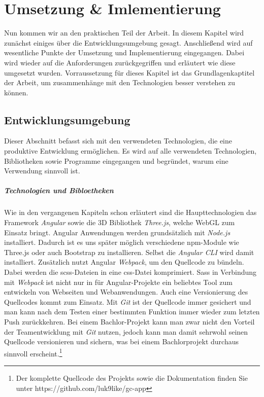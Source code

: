 %
%
%
\chapter{Umsetzung \& Imlementierung}
\label{cha:umsetzung}
%
Nun kommen wir an den praktischen Teil der Arbeit. In diesem Kapitel wird zunächst einiges über die Entwicklungsumgebung gesagt. Anschließend wird auf wesentliche Punkte der Umsetzung und Implementierung eingegangen. Dabei wird wieder auf die Anforderungen zurückgegriffen und erläutert wie diese umgesetzt wurden. Vorraussetzung für dieses Kapitel ist das Grundlagenkaptitel der Arbeit, um zusammenhänge mit den Technologien besser verstehen zu können.
\section{Entwicklungsumgebung}
\label{sec:umsetzung}
%
Dieser Abschnitt befasst sich mit den verwendeten Technologien, die eine produktive Entwicklung ermöglichen. Es wird auf alle verwendeten Technologien, Bibliotheken sowie Programme eingegangen und begründet, warum eine Verwendung sinnvoll ist.\\
\paragraph{Technologien und Bibloetheken}
Wie in den vergangenen Kapiteln schon erläutert sind die Haupttechnologien das Framework \textit{Angular} sowie die 3D Bibliothek \textit{Three.js}, welche WebGL zum Einsatz bringt. Angular Anwendungen werden grundsätzlich mit \textit{Node.js} installiert. Dadurch ist es uns später möglich verschiedene npm-Module wie Three.js oder auch Bootstrap zu installieren. Selbst die \textit{Angular CLI} wird damit installiert. Zusätzlich nutzt Angular \textit{Webpack}, um den Quellcode zu bündeln. Dabei werden die scss-Dateien in eine css-Datei komprimiert. Sass in Verbindung mit \textit{Webpack} ist nicht nur in für Angular-Projekte ein beliebtes Tool zum entwickeln von Webseiten und Webanwendungen. Auch eine Versionierung des Quellcodes kommt zum Einsatz. Mit \textit{Git} ist der Quellcode immer gesichert und man kann nach dem Testen einer bestimmten Funktion immer wieder zum letzten Push zurückkehren. Bei einem Bachlor-Projekt kann man zwar nicht den Vorteil der Teamentwicklung mit \textit{Git} nutzen, jedoch kann man damit sehrwohl seinen Quellcode versionieren und sichern, was bei einem Bachlorprojekt durchaus sinnvoll erscheint.\footnote{Der komplette Quellcode des Projekts sowie die Dokumentation finden Sie unter https://github.com/luk9like/gc-app} 
